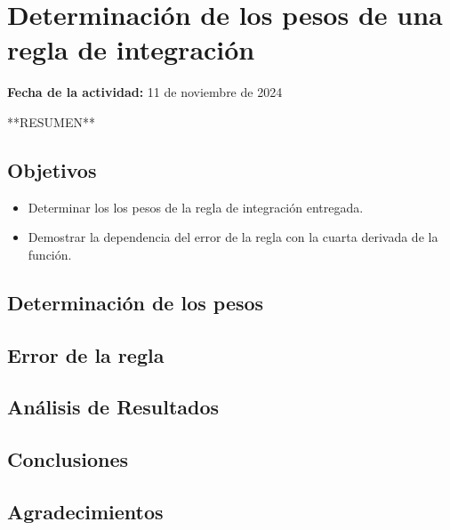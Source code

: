 \documentclass[../portafolio.tex]{subfiles}
\begin{document}
\chapter{Determinación de los pesos de una regla de integración}
\label{ch:3_integracion_pesos}
\hfill \textbf{Fecha de la actividad:} 11 de noviembre de 2024

\medskip

**RESUMEN**

\section*{Objetivos}
\begin{itemize}
\item Determinar los los pesos de la regla de integración entregada.
\item Demostrar la dependencia del error de la regla con la cuarta derivada de la función.
\end{itemize}


\section{Determinación de los pesos}


\section{Error de la regla}


\section{Análisis de Resultados}


\section*{Conclusiones}

\section*{Agradecimientos}
\end{document}
